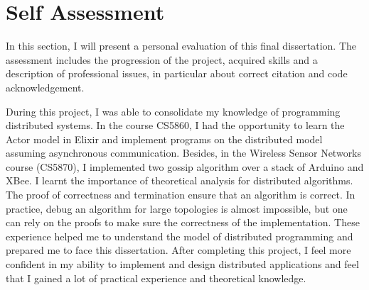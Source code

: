 \section{Self Assessment}
\label{chap:7}


In this section, I will present a personal evaluation of this final dissertation.  The assessment includes the progression of the project, acquired skills and a description of professional issues, in particular about correct citation and code acknowledgement.


During this project, I was able to consolidate my knowledge of programming distributed systems. In the course CS5860, I had the opportunity to learn the Actor model in Elixir and implement programs on the distributed model assuming asynchronous communication. Besides, in the Wireless Sensor Networks course (CS5870), I implemented two gossip algorithm over a stack of Arduino and XBee. I learnt the importance of theoretical analysis for distributed algorithms. The proof of correctness and termination ensure that an algorithm is correct. In practice, debug an algorithm for large topologies is almost impossible, but one can rely on the proofs to make sure the correctness of the implementation. These experience helped me to understand the model of distributed programming and prepared me to face this dissertation. After completing this project, I feel more confident in my ability to implement and design distributed applications and feel that I gained a lot of practical experience and theoretical knowledge.     


